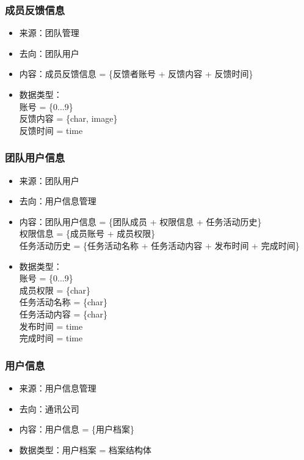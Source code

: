             \subsubsection{成员反馈信息}
            \begin{itemize}
                \item 来源：团队管理
                \item 去向：团队用户
                \item 内容：成员反馈信息 = \{反馈者账号 + 反馈内容 + 反馈时间\}
                \item 数据类型：\\
                账号 = \{0...9\} \\
                反馈内容 = \{char, image\} \\
                反馈时间 = time\\
            \end{itemize}
            \subsubsection{团队用户信息}
            \begin{itemize}
                \item 来源：团队用户
                \item 去向：用户信息管理
                \item 内容：团队用户信息 = \{团队成员 + 权限信息 + 任务活动历史\} \\
                     权限信息 = \{成员账号 + 成员权限\}\\
                     任务活动历史 = \{任务活动名称 + 任务活动内容 + 发布时间 + 完成时间\}\\
                \item 数据类型：\\
                账号 = \{0...9\}\\
                成员权限 = \{char\}\\
                任务活动名称 = \{char\}\\
                任务活动内容 = \{char\}\\
                发布时间 = time\\
                完成时间 = time\\
            \end{itemize}
            \subsubsection{用户信息}
            \begin{itemize}
                \item 来源：用户信息管理
                \item 去向：通讯公司
                \item 内容：用户信息 = \{用户档案\}
                \item 数据类型：用户档案 = 档案结构体
            \end{itemize}
